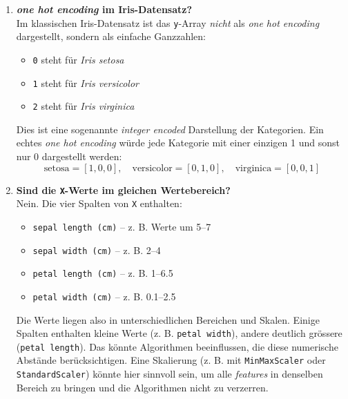 \begin{aufgabe}{2}

\begin{enumerate}
  \item \textbf{\textit{one hot encoding} im Iris-Datensatz?}\\
  Im klassischen Iris-Datensatz ist das \texttt{y}-Array \textit{nicht} als \textit{one hot encoding} dargestellt, sondern als einfache Ganzzahlen:
  \begin{itemize}
    \item \texttt{0} steht für \textit{Iris setosa}
    \item \texttt{1} steht für \textit{Iris versicolor}
    \item \texttt{2} steht für \textit{Iris virginica}
  \end{itemize}
  Dies ist eine sogenannte \textit{integer encoded} Darstellung der Kategorien. Ein echtes \textit{one hot encoding} würde jede Kategorie mit einer einzigen 1 und sonst nur 0 dargestellt werden:
  \[
    \text{setosa} = [1, 0, 0],\quad
    \text{versicolor} = [0, 1, 0],\quad
    \text{virginica} = [0, 0, 1]
  \]

  \item \textbf{Sind die \texttt{X}-Werte im gleichen Wertebereich?}\\
  Nein. Die vier Spalten von \texttt{X} enthalten:
  \begin{itemize}
    \item \texttt{sepal length (cm)} – z. B. Werte um 5–7
    \item \texttt{sepal width (cm)} – z. B. 2–4
    \item \texttt{petal length (cm)} – z. B. 1–6.5
    \item \texttt{petal width (cm)} – z. B. 0.1–2.5
  \end{itemize}
  Die Werte liegen also in unterschiedlichen Bereichen und Skalen. Einige Spalten enthalten kleine Werte (z. B. \texttt{petal width}), andere deutlich grössere (\texttt{petal length}). Das könnte Algorithmen beeinflussen, die diese numerische Abstände berücksichtigen. Eine Skalierung (z. B. mit \texttt{MinMaxScaler} oder \texttt{StandardScaler}) könnte hier sinnvoll sein, um alle \textit{features} in denselben Bereich zu bringen und die Algorithmen nicht zu verzerren.
\end{enumerate}

\end{aufgabe}


